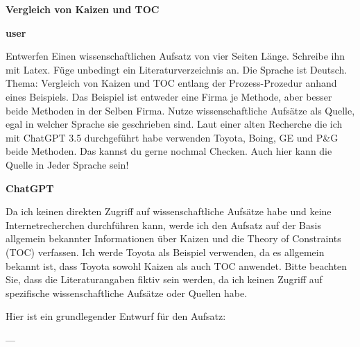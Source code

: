 \textbf{Vergleich von Kaizen und TOC}

\textbf{user}

Entwerfen Einen wissenschaftlichen Aufsatz von vier Seiten Länge. Schreibe ihn mit Latex. Füge unbedingt ein Literaturverzeichnis an. Die Sprache ist Deutsch. Thema: Vergleich von Kaizen und TOC entlang der Prozess-Prozedur anhand eines Beispiels. Das Beispiel ist entweder eine Firma je Methode, aber besser beide Methoden in der Selben Firma. Nutze wissenschaftliche Aufsätze als Quelle, egal in welcher Sprache sie geschrieben sind. Laut einer alten Recherche die ich mit ChatGPT 3.5 durchgeführt habe verwenden Toyota, Boing, GE und P\&G beide Methoden. Das kannst du gerne nochmal Checken. Auch hier kann die Quelle in Jeder Sprache sein! 

\textbf{ChatGPT}

Da ich keinen direkten Zugriff auf wissenschaftliche Aufsätze habe und keine Internetrecherchen durchführen kann, werde ich den Aufsatz auf der Basis allgemein bekannter Informationen über Kaizen und die Theory of Constraints (TOC) verfassen. Ich werde Toyota als Beispiel verwenden, da es allgemein bekannt ist, dass Toyota sowohl Kaizen als auch TOC anwendet. Bitte beachten Sie, dass die Literaturangaben fiktiv sein werden, da ich keinen Zugriff auf spezifische wissenschaftliche Aufsätze oder Quellen habe. 

Hier ist ein grundlegender Entwurf für den Aufsatz:

---

